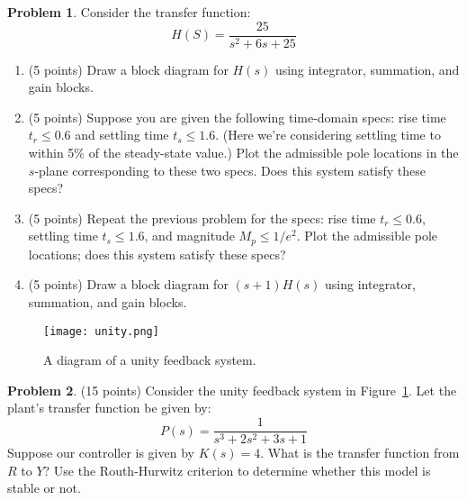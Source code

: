 \documentclass{article}
\theoremstyle{definition}
\newtheorem{problem}{Problem}
\begin{document}
\begin{problem}
Consider the transfer function:
\[
H(S) = \dfrac{25}{s^2 + 6 s + 25}
\]
\begin{enumerate}[label=(\alph*), noitemsep]
\item (5 points)
Draw a block diagram for $H(s)$ using integrator, summation, and 
gain blocks.
\item (5 points) Suppose you are given the following time-domain
specs: rise time $t_r \leq 0.6$ and settling time $t_s \leq 1.6$.
(Here we're considering settling time to within 5\% of the 
steady-state value.) Plot the admissible pole locations in the 
$s$-plane corresponding to these two specs. Does this system satisfy 
these specs?
\item (5 points) Repeat the previous problem for the specs: rise 
time $t_r \leq 0.6$, settling time $t_s \leq 1.6$, and magnitude $M_p 
\leq 1/e^2$. Plot the admissible pole locations; does this system 
satisfy these specs?
\item (5 points) Draw a block diagram for $(s+1)H(s)$ using 
integrator, summation, and gain blocks.
\end{enumerate}
\end{problem}
\begin{figure}[!ht]
 	\begin{center}
 	\texttt{[image: unity.png]}
 	\end{center}
 	\caption{A diagram of a unity feedback system.}
 	\label{fig:unity}
 \end{figure}
\begin{problem} (15 points) Consider the unity feedback system in
Figure~\ref{fig:unity}. Let the plant's transfer function be given by:
\[
P(s) = \frac{1}{s^3 + 2s^2 + 3s + 1}
\]
Suppose our controller is given by $K(s) = 4$. 
What is the transfer function from $R$ to $Y$? Use the Routh-Hurwitz 
criterion to determine whether this model is stable or not.
\end{problem}
\end{document}
